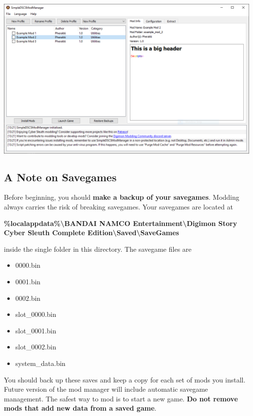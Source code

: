 \documentclass{article}
\begin{document}
  \begin{center}
    \includegraphics[scale=0.406]{img/modmanager_ui.png}
  \end{center}
  
\subsection{A Note on Savegames}
Before beginning, you should \textbf{make a backup of your savegames}. Modding always carries the risk of breaking savegames. Your savegames are located at 
\begin{center}
\textbf{\%localappdata\%\textbackslash BANDAI NAMCO Entertainment\textbackslash Digimon Story Cyber Sleuth Complete Edition\textbackslash Saved\textbackslash SaveGames}
\end{center}
inside the single folder in this directory. The savegame files are 
\begin{itemize}
\item 0000.bin
\item 0001.bin
\item 0002.bin
\item slot\_0000.bin
\item slot\_0001.bin
\item slot\_0002.bin
\item system\_data.bin
\end{itemize}
You should back up these saves and keep a copy for each set of mods you install. Future version of the mod manager will include automatic savegame management. The safest way to mod is to start a new game. \textbf{Do not remove mods that add new data from a saved game}.
  
\end{document}

